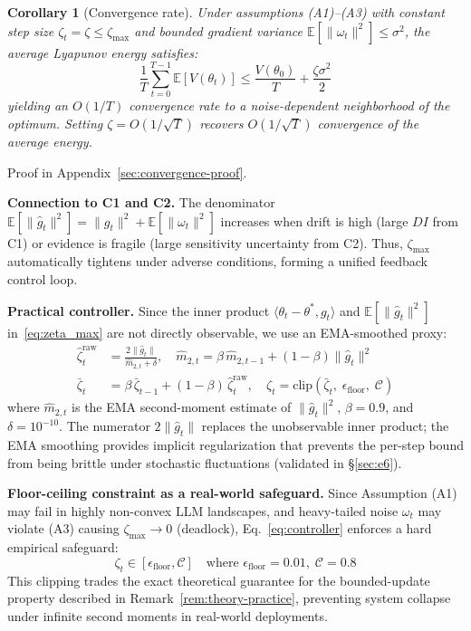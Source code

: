 \documentclass{article}
\newtheorem{corollary}{Corollary}
\begin{document}
\begin{corollary}[Convergence rate]
\label{cor:convergence}
Under assumptions (A1)--(A3) with constant step size
$\zeta_t = \zeta \leq \zeta_{\max}$ and bounded gradient variance
$\mathbb{E}[\|\omega_t\|^2] \leq \sigma^2$, the average
Lyapunov energy satisfies:
\begin{equation}
  \frac{1}{T}\sum_{t=0}^{T-1} \mathbb{E}[V(\theta_t)]
  \leq \frac{V(\theta_0)}{T} + \frac{\zeta \sigma^2}{2}
  \label{eq:convergence}
\end{equation}
yielding an $O(1/T)$ convergence rate to a noise-dependent
neighborhood of the optimum. Setting
$\zeta = O(1/\sqrt{T})$ recovers $O(1/\sqrt{T})$ convergence
of the average energy.
\end{corollary}
Proof in Appendix~\ref{sec:convergence-proof}.

\textbf{Connection to C1 and C2.} The denominator
$\mathbb{E}[\|\hat{g}_t\|^2] = \|g_t\|^2 + \mathbb{E}[\|\omega_t\|^2]$
increases when drift is high (large $DI$ from C1) or evidence is
fragile (large sensitivity uncertainty from C2). Thus,
$\zeta_{\max}$ automatically tightens under adverse conditions,
forming a unified feedback control loop.

\textbf{Practical controller.} Since the inner product
$\langle \theta_t{-}\theta^*, g_t \rangle$ and $\mathbb{E}[\|\hat{g}_t\|^2]$
in~\eqref{eq:zeta_max} are not directly observable, we use an
EMA-smoothed proxy:
\begin{align}
  \hat{\zeta}^{\text{raw}}_t
    &= \frac{2\|\hat{g}_t\|}{\hat{m}_{2,t} + \delta},
    \quad
    \hat{m}_{2,t} = \beta\,\hat{m}_{2,t-1}
      + (1{-}\beta)\|\hat{g}_t\|^2
    \label{eq:zeta-raw} \\
  \bar{\zeta}_t &= \beta\,\bar{\zeta}_{t-1}
    + (1{-}\beta)\,\hat{\zeta}^{\text{raw}}_t,
    \quad
    \zeta_t = \mathrm{clip}(\bar{\zeta}_t,\;
      \epsilon_{\text{floor}},\; \mathcal{C})
    \label{eq:controller}
\end{align}
where $\hat{m}_{2,t}$ is the EMA second-moment estimate of
$\|\hat{g}_t\|^2$, $\beta{=}0.9$, and $\delta{=}10^{-10}$.
The numerator $2\|\hat{g}_t\|$ replaces the unobservable inner
product; the EMA smoothing provides implicit regularization that
prevents the per-step bound from being brittle under stochastic
fluctuations (validated in \S\ref{sec:e6}).

\textbf{Floor-ceiling constraint as a real-world safeguard.}
\label{par:heavytail}
Since Assumption (A1) may fail in highly non-convex LLM landscapes, and heavy-tailed noise $\omega_t$ may violate (A3) causing $\zeta_{\max} \to 0$ (deadlock), Eq.~\eqref{eq:controller} enforces a hard empirical safeguard:
\begin{equation}
  \zeta_t \in [\epsilon_{\text{floor}}, \mathcal{C}]
  \quad \text{where } \epsilon_{\text{floor}} = 0.01,\;
  \mathcal{C} = 0.8
  \label{eq:floor}
\end{equation}
This clipping trades the exact theoretical guarantee for the bounded-update property described in Remark~\ref{rem:theory-practice}, preventing system collapse under infinite second moments in real-world deployments.
\end{document}
